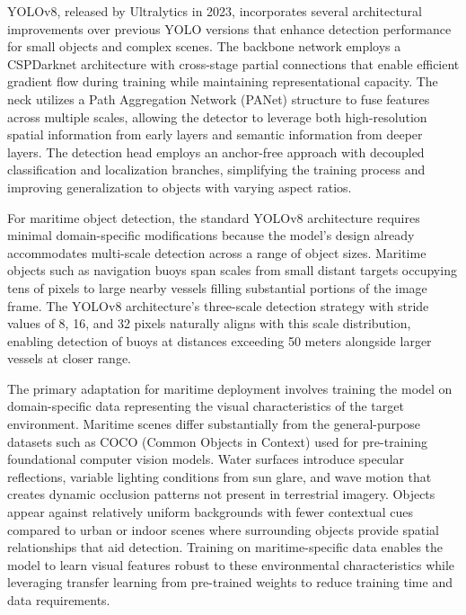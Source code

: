 \documentclass{erauthesis}
\begin{document}
YOLOv8, released by Ultralytics in 2023, incorporates several architectural improvements over previous YOLO versions that enhance detection performance for small objects and complex scenes.
The backbone network employs a CSPDarknet architecture with cross-stage partial connections that enable efficient gradient flow during training while maintaining representational capacity.
The neck utilizes a Path Aggregation Network (PANet) structure to fuse features across multiple scales, allowing the detector to leverage both high-resolution spatial information from early layers and semantic information from deeper layers.
The detection head employs an anchor-free approach with decoupled classification and localization branches, simplifying the training process and improving generalization to objects with varying aspect ratios.

For maritime object detection, the standard YOLOv8 architecture requires minimal domain-specific modifications because the model's design already accommodates multi-scale detection across a range of object sizes.
Maritime objects such as navigation buoys span scales from small distant targets occupying tens of pixels to large nearby vessels filling substantial portions of the image frame.
The YOLOv8 architecture's three-scale detection strategy with stride values of 8, 16, and 32 pixels naturally aligns with this scale distribution, enabling detection of buoys at distances exceeding 50 meters alongside larger vessels at closer range.

The primary adaptation for maritime deployment involves training the model on domain-specific data representing the visual characteristics of the target environment.
Maritime scenes differ substantially from the general-purpose datasets such as COCO (Common Objects in Context) used for pre-training foundational computer vision models.
Water surfaces introduce specular reflections, variable lighting conditions from sun glare, and wave motion that creates dynamic occlusion patterns not present in terrestrial imagery.
Objects appear against relatively uniform backgrounds with fewer contextual cues compared to urban or indoor scenes where surrounding objects provide spatial relationships that aid detection.
Training on maritime-specific data enables the model to learn visual features robust to these environmental characteristics while leveraging transfer learning from pre-trained weights to reduce training time and data requirements.

\end{document}
